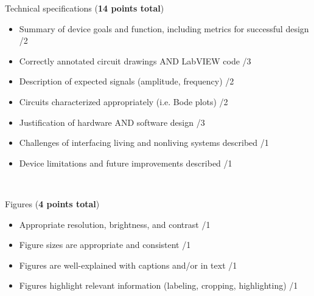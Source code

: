 \documentclass{article}
\begin{document}
Technical specifications (\textbf{14 points total})
\begin{small}
\begin{itemize}
	\item Summary of device goals and function, including metrics for successful design \hfill \underline{\hspace{1cm}}/2
	\item Correctly annotated circuit drawings AND LabVIEW code \hfill \underline{\hspace{1cm}}/3
	\item Description of expected signals (amplitude, frequency) \hfill \underline{\hspace{1cm}}/2
	\item Circuits characterized appropriately (i.e. Bode plots) \hfill \underline{\hspace{1cm}}/2
	\item Justification of hardware AND software design \hfill \underline{\hspace{1cm}}/3
	\item Challenges of interfacing living and nonliving systems described \hfill \underline{\hspace{1cm}}/1
	\item Device limitations and future improvements described \hfill \underline{\hspace{1cm}}/1
\end{itemize}
\end{small}\

Figures (\textbf{4 points total})
\begin{small}
\begin{itemize}
	\item Appropriate resolution, brightness, and contrast \hfill \underline{\hspace{1cm}}/1
	\item Figure sizes are appropriate and consistent \hfill \underline{\hspace{1cm}}/1
	\item Figures are well-explained with captions and/or in text \hfill \underline{\hspace{1cm}}/1
	\item Figures highlight relevant information (labeling, cropping, highlighting) \hfill \underline{\hspace{1cm}}/1
\end{itemize}
\end{small}\
\end{document}
